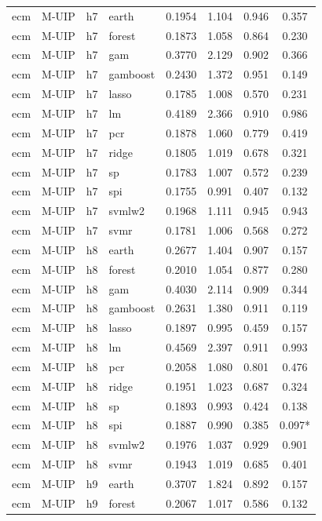 \begin{ThreePartTable}
\begin{longtable}[t]{llclcccc}
\addlinespace
ecm & M-UIP & h7 & earth & 0.1954 & 1.104 & 0.946 & 0.357\\
ecm & M-UIP & h7 & forest & 0.1873 & 1.058 & 0.864 & 0.230\\
ecm & M-UIP & h7 & gam & 0.3770 & 2.129 & 0.902 & 0.366\\
ecm & M-UIP & h7 & gamboost & 0.2430 & 1.372 & 0.951 & 0.149\\
ecm & M-UIP & h7 & lasso & 0.1785 & 1.008 & 0.570 & 0.231\\
ecm & M-UIP & h7 & lm & 0.4189 & 2.366 & 0.910 & 0.986\\
ecm & M-UIP & h7 & pcr & 0.1878 & 1.060 & 0.779 & 0.419\\
ecm & M-UIP & h7 & ridge & 0.1805 & 1.019 & 0.678 & 0.321\\
ecm & M-UIP & h7 & sp & 0.1783 & 1.007 & 0.572 & 0.239\\
ecm & M-UIP & h7 & spi & 0.1755 & 0.991 & 0.407 & 0.132\\
ecm & M-UIP & h7 & svmlw2 & 0.1968 & 1.111 & 0.945 & 0.943\\
ecm & M-UIP & h7 & svmr & 0.1781 & 1.006 & 0.568 & 0.272\\
\addlinespace
ecm & M-UIP & h8 & earth & 0.2677 & 1.404 & 0.907 & 0.157\\
ecm & M-UIP & h8 & forest & 0.2010 & 1.054 & 0.877 & 0.280\\
ecm & M-UIP & h8 & gam & 0.4030 & 2.114 & 0.909 & 0.344\\
ecm & M-UIP & h8 & gamboost & 0.2631 & 1.380 & 0.911 & 0.119\\
ecm & M-UIP & h8 & lasso & 0.1897 & 0.995 & 0.459 & 0.157\\
ecm & M-UIP & h8 & lm & 0.4569 & 2.397 & 0.911 & 0.993\\
ecm & M-UIP & h8 & pcr & 0.2058 & 1.080 & 0.801 & 0.476\\
ecm & M-UIP & h8 & ridge & 0.1951 & 1.023 & 0.687 & 0.324\\
ecm & M-UIP & h8 & sp & 0.1893 & 0.993 & 0.424 & 0.138\\
ecm & M-UIP & h8 & spi & 0.1887 & 0.990 & 0.385 & 0.097*\\
ecm & M-UIP & h8 & svmlw2 & 0.1976 & 1.037 & 0.929 & 0.901\\
ecm & M-UIP & h8 & svmr & 0.1943 & 1.019 & 0.685 & 0.401\\
\addlinespace
ecm & M-UIP & h9 & earth & 0.3707 & 1.824 & 0.892 & 0.157\\
ecm & M-UIP & h9 & forest & 0.2067 & 1.017 & 0.586 & 0.132\\

\end{longtable}
\end{ThreePartTable}
